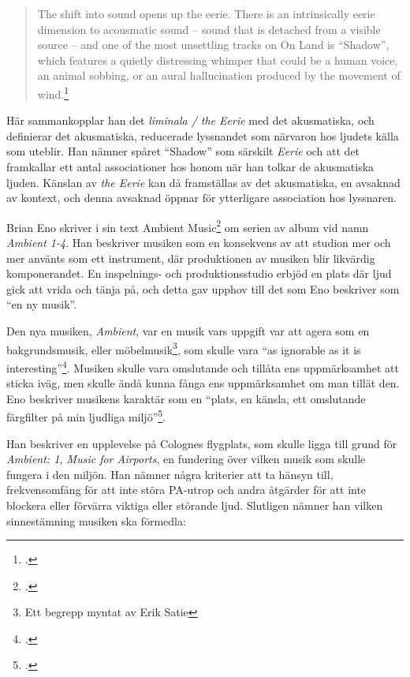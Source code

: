\documentclass{article}
\begin{document}
\begin{quote}
The shift into sound opens up the eerie. There is an intrinsically eerie dimension to acousmatic sound -- sound
that is detached from a visible source -- and one of the most unsettling tracks on On Land is ``Shadow'', which
features a quietly distressing whimper that could be a human voice, an animal sobbing, or an aural
hallucination produced by the movement of wind.\footcite[81]{Fisher}
\end{quote}
Här sammankopplar han det \emph{liminala / the Eerie} med det akusmatiska, och definierar det akusmatiska,
reducerade lyssnandet som närvaron hos ljudets källa som uteblir. Han nämner spåret ``Shadow'' som särskilt
\emph{Eerie} och att det framkallar ett antal associationer hos honom när han tolkar de akusmatiska ljuden.
Känslan av \emph{the Eerie} kan då framställas av det akusmatiska, en avsaknad av kontext, och denna avsaknad
öppnar för ytterligare association hos lyssnaren.

Brian Eno skriver i sin text Ambient Music\footcite[149-153]{Eno} om serien av album vid namn \emph{Ambient
1-4}. Han beskriver musiken som en konsekvens av att studion mer och mer använts som ett instrument, där
produktionen av musiken blir likvärdig komponerandet. En inspelnings- och produktionsstudio erbjöd en plats
där ljud gick att vrida och tänja på, och detta gav upphov till det som Eno beskriver som ``en ny musik''.

Den nya musiken, \emph{Ambient}, var en musik vars uppgift var att agera som en bakgrundsmusik, eller
möbelmusik\footnote{Ett begrepp myntat av Erik Satie}, som skulle vara ``as ignorable as it is
interesting''\footcite{Airports}. Musiken skulle vara omslutande och tillåta ens uppmärksamhet att sticka
iväg, men skulle ändå kunna fånga ens uppmärksamhet om man tillät den. Eno beskriver musikens karaktär som en
``plats, en känsla, ett omslutande färgfilter på min ljudliga miljö''\footcite[Egen översättning, s. 151]{Eno}.

Han beskriver en upplevelse på Colognes flygplats, som skulle ligga till grund för \emph{Ambient: 1, Music for
Airports}, en fundering över vilken musik som skulle fungera i den miljön. Han nämner några kriterier att ta
hänsyn till, frekvensomfång för att inte störa PA-utrop och andra åtgärder för att inte blockera eller
förvärra viktiga eller störande ljud. Slutligen nämner han vilken sinnestämning musiken ska förmedla:
\end{document}
